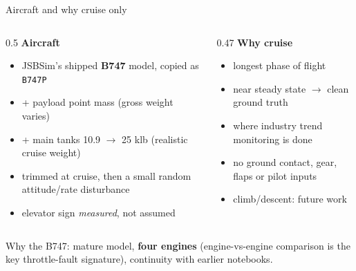 \documentclass[aspectratio=169,11pt]{beamer}
\begin{document}
\begin{frame}{Aircraft and why cruise only}
  \begin{columns}[T]
    \begin{column}{0.5\textwidth}
      \textbf{Aircraft}
      \begin{itemize}\small
        \item JSBSim's shipped \textbf{B747} model, copied as \texttt{B747P}
        \item + payload point mass (gross weight varies)
        \item + main tanks 10.9 $\rightarrow$ 25 klb (realistic cruise weight)
        \item trimmed at cruise, then a small random attitude/rate disturbance
        \item elevator sign \emph{measured}, not assumed
      \end{itemize}
    \end{column}
    \begin{column}{0.47\textwidth}
      \textbf{Why cruise}
      \begin{itemize}\small
        \item longest phase of flight
        \item near steady state $\rightarrow$ clean ground truth
        \item where industry trend monitoring is done
        \item no ground contact, gear, flaps or pilot inputs
        \item climb/descent: future work
      \end{itemize}
    \end{column}
  \end{columns}
  \vspace{0.8em}
  \begin{block}{}
    \small Why the B747: mature model, \textbf{four engines} (engine-vs-engine comparison is the key throttle-fault signature), continuity with earlier notebooks.
  \end{block}
\end{frame}
\end{document}
